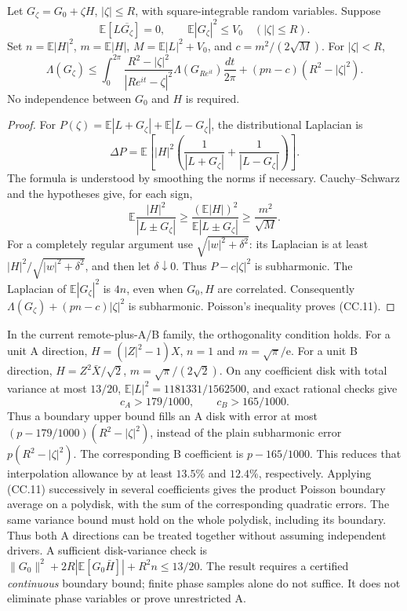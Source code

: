 \begin{theorem}
\label{thm:cc-poisson}
Let \(G_\zeta=G_0+\zeta H\), \(|\zeta|\le R\), with square-integrable
random variables. Suppose
\[
 \mathbb E[L\overline{G_\zeta}]=0,
 \qquad \mathbb E|G_\zeta|^2\le V_0 \quad(|\zeta|\le R).
\]
Set \(n=\mathbb E|H|^2\), \(m=\mathbb E|H|\),
\(M=\mathbb E|L|^2+V_0\), and \(c=m^2/(2\sqrt M)\).
For \(|\zeta|<R\),
\[
 \boxed{\quad
 \Lambda(G_\zeta)\le
 \int_0^{2\pi}\frac{R^2-|\zeta|^2}{|Re^{it}-\zeta|^2}
               \Lambda(G_{Re^{it}})\frac{dt}{2\pi}
 +(pn-c)(R^2-|\zeta|^2).
 \quad} \tag{CC.11}
\]
No independence between \(G_0\) and \(H\) is required.
\end{theorem}
\begin{proof}
For \(P(\zeta)=\mathbb E|L+G_\zeta|+\mathbb E|L-G_\zeta|\),
the distributional Laplacian is
\[
 \Delta P=\mathbb E\left[|H|^2
       \left(\frac1{|L+G_\zeta|}+\frac1{|L-G_\zeta|}\right)\right].
\]
The formula is understood by smoothing the norms if necessary.
Cauchy--Schwarz and the hypotheses give, for each sign,
\[
 \mathbb E\frac{|H|^2}{|L\pm G_\zeta|}
 \ge\frac{(\mathbb E|H|)^2}{\mathbb E|L\pm G_\zeta|}
 \ge\frac{m^2}{\sqrt M}.
\]
For a completely regular argument use \(\sqrt{|w|^2+\delta^2}\): its
Laplacian is at least \(|H|^2/\sqrt{|w|^2+\delta^2}\), and then let
\(\delta\downarrow0\). Thus \(P-c|\zeta|^2\) is subharmonic.
The Laplacian of \(\mathbb E|G_\zeta|^2\) is \(4n\), even when
\(G_0,H\) are correlated. Consequently
\(\Lambda(G_\zeta)+(pn-c)|\zeta|^2\) is subharmonic. Poisson's
inequality proves (CC.11).
\end{proof}

In the current remote-plus-A/B family, the orthogonality condition holds.
For a unit A direction, \(H=(|Z|^2-1)X\),
\(n=1\) and \(m=\sqrt\pi/\mathrm e\). For a unit B direction,
\(H=Z^2\bar X/\sqrt2\), \(m=\sqrt\pi/(2\sqrt2)\).
On any coefficient disk with total variance at most \(13/20\),
\(\mathbb E|L|^2=1181331/1562500\), and exact rational checks give
\[
 c_A>179/1000,\qquad c_B>165/1000. \tag{CC.12}
\]
Thus a boundary upper bound fills an A disk with error at most
\((p-179/1000)(R^2-|\zeta|^2)\), instead of the plain subharmonic
error \(p(R^2-|\zeta|^2)\). The corresponding B coefficient is
\(p-165/1000\). This reduces that interpolation allowance by at least
\(13.5\%\) and \(12.4\%\), respectively.
Applying (CC.11) successively in several coefficients gives the product
Poisson boundary average on a polydisk, with the sum of the corresponding
quadratic errors. The same variance bound must hold on the whole
polydisk, including its boundary. Thus both A directions can be treated
together without assuming independent drivers.
A sufficient disk-variance check is
\(\|G_0\|^2+2R|\mathbb E[G_0\bar H]|+R^2n\le13/20\).
The result requires a certified \emph{continuous} boundary bound;
finite phase samples alone do not suffice. It does not eliminate
phase variables or prove unrestricted A.

